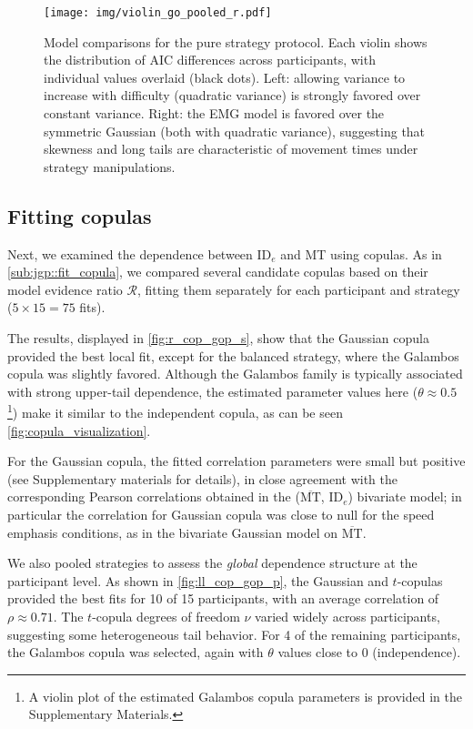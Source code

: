\documentclass[acmlarge, manuscript,review]{acmart}
\newcommand{\mmt}{\ensuremath{\overline{\mt}}\xspace}
\newcommand{\mt}{\ensuremath{{\text{MT}}}\xspace}
\newcommand{\ide}{\ensuremath{{\text{ID}_e}}\xspace}
\begin{document}
\begin{figure}[htbp]
	\centering
	\texttt{[image: img/violin\_go\_pooled\_r.pdf]}
	\caption{Model comparisons for the pure strategy protocol. Each violin shows the distribution of AIC differences across participants, with individual values overlaid (black dots). Left: allowing variance to increase with difficulty (quadratic variance) is strongly favored over constant variance. Right: the EMG model is favored over the symmetric Gaussian (both with quadratic variance), suggesting that skewness and long tails are characteristic of movement times under strategy manipulations.}
	\label{fig:violin_go}
\end{figure}

\subsection{Fitting copulas \label{sub:go:fit_cop}}


Next, we examined the dependence between \ide and MT using copulas. As in \autoref{sub:jgp::fit_copula}, we compared several candidate copulas based on their model evidence ratio $\mathcal{R}$, fitting them separately for each participant and strategy ($5\times 15=75$ fits).

The results, displayed in \autoref{fig:r_cop_gop_s}, show that the Gaussian copula provided the best local fit, except for the balanced strategy, where the Galambos copula was slightly favored. Although the Galambos family is typically associated with strong upper-tail dependence, the estimated parameter values here ($\theta \approx 0.5$\footnote{A violin plot of the estimated Galambos copula parameters is provided in the Supplementary Materials.}) make it similar to the independent copula, as can be seen \autoref{fig:copula_visualization}. 

For the Gaussian copula, the fitted correlation parameters were small but positive (see Supplementary materials for details), in close agreement with the corresponding Pearson correlations obtained in the (\mmt, \ide) bivariate model; in particular the correlation for Gaussian copula was close to null for the speed emphasis conditions, as in the bivariate Gaussian model on \mmt.

We also pooled strategies to assess the \textit{global} dependence structure at the participant level. As shown in \autoref{fig:ll_cop_gop_p}, the Gaussian and $t$-copulas provided the best fits for 10 of 15 participants, with an average correlation of $\rho \approx 0.71$. The $t$-copula degrees of freedom $\nu$ varied widely across participants, suggesting some heterogeneous tail behavior. For 4 of the remaining participants, the Galambos copula was selected, again with $\theta$ values close to 0 (independence).
\end{document}
